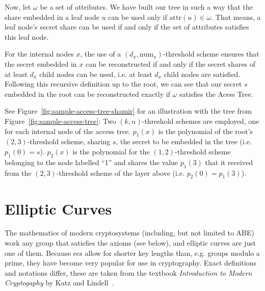 Now, let $\omega$ be a set of attributes.
We have built our tree in such a way that the share embedded in a leaf node $u$ can be used only if $\text{attr}(u) \in \omega$.
That means, a leaf node's secret share can be used if and only if the set of attributes satisfies this leaf node.

For the internal nodes $x$, the use of a $(d_x, \text{num}_x)$-threshold scheme ensures that the secret embedded in $x$ can be reconstructed if and only if the secret shares of at least $d_x$ child nodes can be used, i.e. at least $d_x$ child nodes are satisfied.
Following this recursive definition up to the root, we can see that our secret $s$ embedded in the root can be reconstructed exactly if $\omega$ satisfies the Acess Tree.

See Figure~\ref{fig:sample-access-tree-shamir} for an illustration with the tree from Figure~\ref{fig:sample-access-tree}:
Two $(k,n)$-threshold schemes are employed, one for each internal node of the access tree.
$p_1(x)$ is the polynomial of the root's $(2,3)$-threshold scheme, sharing $s$, the secret to be embedded in the tree (i.e. $p_1(0) = s$).
$p_2(x)$ is the polynomial for the $(1,2)$-threshold scheme belonging to the node labelled ``1'' and shares the value $p_1(3)$ that it received from the $(2,3)$-threshold scheme of the layer above (i.e. $p_2(0) = p_1(3)$).

\section{Elliptic Curves}
\label{sec:ec}

The mathematics of modern cryptosystems (including, but not limited to ABE) work any group that satisfies the axioms (see below), and elliptic curves are just one of them.
Because \Glspl{ec} allow for shorter key lengths than, e.g. groups modulo a prime, they have become very popular for use in cryptography.
Exact definitions and notations differ, these are taken from the textbook \emph{Introduction to Modern Cryptogaphy} by Katz and Lindell~\cite{katz_introduction_2015}.

